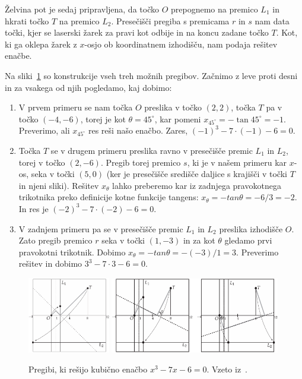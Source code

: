 Želvina pot je sedaj pripravljena, da točko $O$ prepognemo na premico $L_1$ in hkrati točko $T$ na premico $L_2$. Presečišči pregiba s premicama $r$ in $s$ nam data točki, kjer se laserski žarek za pravi kot odbije in na koncu zadane točko $T$. Kot, ki ga oklepa žarek z $x$-osjo ob koordinatnem izhodišču, nam podaja rešitev enačbe.

Na sliki~\ref{fig:lill_primer_pregibi} so konstrukcije vseh treh možnih pregibov. Začnimo z leve proti desni in za vsakega od njih pogledamo, kaj dobimo:
\begin{enumerate}
    \item V prvem primeru se nam točka $O$ preslika v točko $(2,2)$, točka $T$ pa v točko $(-4,-6)$, torej je kot $\theta = 45^\circ$, kar pomeni $x_{45^\circ} = -\tan 45^\circ = -1$. Preverimo, ali $x_{45^\circ}$ res reši našo enačbo. Zares, $(-1)^3 - 7\cdot(-1) - 6 = 0$.
    \item Točka $T$ se v drugem primeru preslika ravno v presečišče premic $L_1$ in $L_2$, torej v točko $(2,-6)$. Pregib torej premico $s$, ki je v našem primeru kar $x$-os, seka v točki $(5,0)$ (ker je presečišče središče daljice s krajišči v točki $T$ in njeni sliki). Rešitev $x_\theta$ lahko preberemo kar iz zadnjega pravokotnega trikotnika preko definicije kotne funkcije tangens: $x_\theta = -tan \theta = -6/3 = -2$. In res je $(-2)^3 - 7\cdot(-2) - 6 = 0$.
    \item V zadnjem primeru pa se v presečišče premic $L_1$ in $L_2$ preslika izhodišče $O$. Zato pregib premico $r$ seka v točki $(1,-3)$ in za kot $\theta$ gledamo prvi pravokotni trikotnik. Dobimo $x_\theta = -tan \theta = -(-3)/1 = 3$. Preverimo rešitev in dobimo $3^3 - 7\cdot3 - 6 = 0$.
\end{enumerate}

\begin{figure}[h]
    \centering
    \includegraphics[width=0.32\textwidth]{images/kubična enačba/lill_primer_pregib1.png}
    \includegraphics[width=0.66\textwidth]{images/kubična enačba/lill_primer_pregib2_3.png}
    \caption[Primer reševanja z Lillovo metodo (s pregibi)]{Pregibi, ki rešijo kubično enačbo $x^3 - 7x - 6 = 0$. Vzeto iz~\cite[str. 91--92]{hull2013}.}
    \label{fig:lill_primer_pregibi}
\end{figure}

